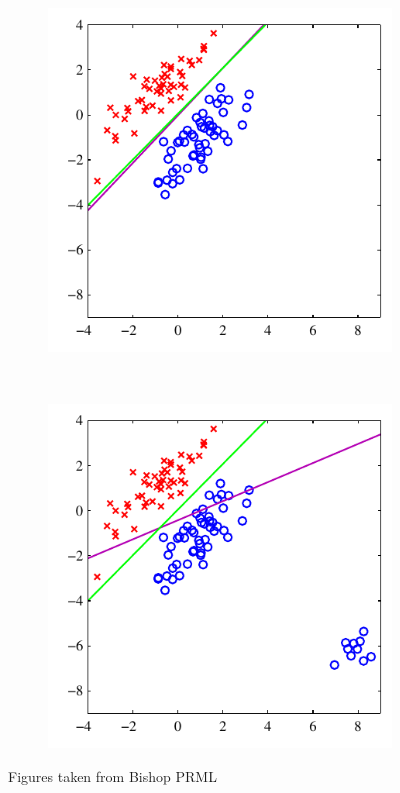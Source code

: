 \begin{figure}
	\begin{subfigure}[b]{0.45\textwidth}
		\includegraphics[width=\textwidth]{./lecture7/Figure44a.pdf}
	\end{subfigure}
	~
	\begin{subfigure}[b]{0.45\textwidth}
		\includegraphics[width=\textwidth]{./lecture7/Figure44b.pdf}
	\end{subfigure}	
	\caption{Figures taken from Bishop PRML}
\end{figure}


